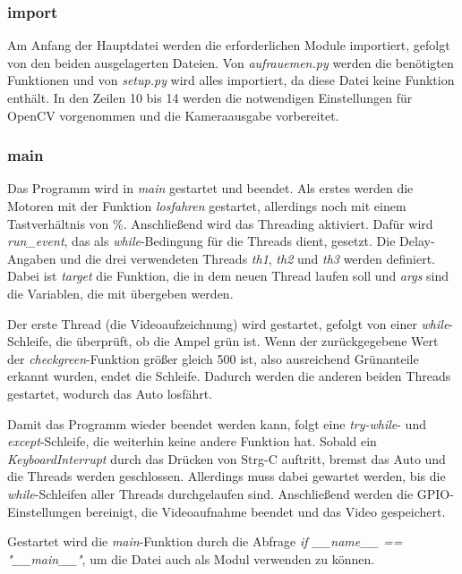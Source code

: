 \documentclass[a4paper, 12pt]{scrartcl}
\begin{document}
\subsubsection{import}


Am Anfang der Hauptdatei werden die erforderlichen Module importiert, gefolgt von den beiden ausgelagerten Dateien. Von \textit{aufrauemen.py} werden die benötigten Funktionen und von \textit{setup.py} wird alles importiert, da diese Datei keine Funktion enthält. In den Zeilen 10 bis 14 werden die notwendigen Einstellungen für OpenCV vorgenommen und die Kameraausgabe vorbereitet.

\subsubsection{main}


Das Programm wird in \textit{main} gestartet und beendet. Als erstes werden die Motoren mit der Funktion \textit{losfahren} gestartet, allerdings noch mit einem Tastverhältnis von \unit[0]{\%}.
Anschließend wird das Threading aktiviert. Dafür wird \textit{run\_event}, das als \textit{while}-Bedingung für die Threads dient, gesetzt. Die Delay-Angaben und die drei verwendeten Threads \textit{th1}, \textit{th2} und \textit{th3} werden definiert. Dabei ist \textit{target} die Funktion, die in dem neuen Thread laufen soll und \textit{args} sind die Variablen, die mit übergeben werden.

Der erste Thread (die Videoaufzeichnung) wird gestartet, gefolgt von einer \textit{while}-Schleife, die überprüft, ob die Ampel grün ist. Wenn der zurückgegebene Wert der \textit{checkgreen}-Funktion größer gleich 500 ist, also ausreichend Grünanteile erkannt wurden, endet die Schleife. Dadurch werden die anderen beiden Threads gestartet, wodurch das Auto losfährt.

Damit das Programm wieder beendet werden kann, folgt eine \textit{try-while}- und \textit{except}-Schleife, die weiterhin keine andere Funktion hat. Sobald ein \textit{KeyboardInterrupt} durch das Drücken von Strg-C auftritt, bremst das Auto und die Threads werden geschlossen. Allerdings muss dabei gewartet werden, bis die \textit{while}-Schleifen aller Threads durchgelaufen sind. Anschließend werden die GPIO-Einstellungen bereinigt, die Videoaufnahme beendet und das Video gespeichert.

Gestartet wird die \textit{main}-Funktion durch die Abfrage \textit{if \_\_name\_\_ == "\_\_main\_\_"}, um die Datei auch als Modul verwenden zu können.
\end{document}
